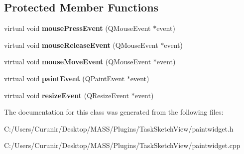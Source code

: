 \subsection*{Protected Member Functions}
\begin{DoxyCompactItemize}
\item 
\mbox{\label{class_paint_widget_a1c7eb81a97caded4a094b978695c94d4}} 
virtual void {\bfseries mouse\+Press\+Event} (Q\+Mouse\+Event $\ast$event)
\item 
\mbox{\label{class_paint_widget_ae1eb322803e4a255a2db108410ac8f35}} 
virtual void {\bfseries mouse\+Release\+Event} (Q\+Mouse\+Event $\ast$event)
\item 
\mbox{\label{class_paint_widget_a66e1dca2bebbba5d84e8dab66c05e2db}} 
virtual void {\bfseries mouse\+Move\+Event} (Q\+Mouse\+Event $\ast$event)
\item 
\mbox{\label{class_paint_widget_ae4a27141cb8bef3cf93889fec4fc9411}} 
virtual void {\bfseries paint\+Event} (Q\+Paint\+Event $\ast$event)
\item 
\mbox{\label{class_paint_widget_ac8ba3ebb21b873fccde32329f7d3d55d}} 
virtual void {\bfseries resize\+Event} (Q\+Resize\+Event $\ast$event)
\end{DoxyCompactItemize}


The documentation for this class was generated from the following files\+:\begin{DoxyCompactItemize}
\item 
C\+:/\+Users/\+Curunir/\+Desktop/\+M\+A\+S\+S/\+Plugins/\+Task\+Sketch\+View/paintwidget.\+h\item 
C\+:/\+Users/\+Curunir/\+Desktop/\+M\+A\+S\+S/\+Plugins/\+Task\+Sketch\+View/paintwidget.\+cpp\end{DoxyCompactItemize}
